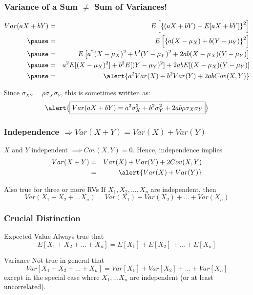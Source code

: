 \documentclass[handout]{beamer}
\begin{document}
\begin{frame}
\frametitle{Variance of a Sum $\neq$ Sum of Variances!}
\footnotesize
\begin{eqnarray*}
	Var(aX + bY) &=& E\left[\left\{\left( aX + bY\right) - E[aX + bY]\right\}^2  \right]\\ \pause
	&=& E\left[  \left\{a (X - \mu_X) + b(Y - \mu_Y)\right\}^2 \right]\\ \pause
	&=& E\left[a^2(X-\mu_X)^2 + b^2(Y-\mu_Y)^2 + 2ab(X-\mu_X)(Y-\mu_Y)  \right]\\ \pause
	&=&a^2E[(X-\mu_X)^2] + b^2 E[(Y-\mu_Y)^2] + 2ab E[(X-\mu_X)(Y-\mu_Y)]\\ \pause
	&=& \alert{a^2 Var(X) + b^2 Var(Y) + 2ab Cov(X,Y)}
\end{eqnarray*}


\vspace{3em}
\normalsize
Since $\sigma_{XY} = \rho\sigma_X \sigma_Y$, this is sometimes written as:
$$\alert{\boxed{Var(aX + bY) = a^2 \sigma_X^2 + b^2 \sigma_Y^2 + 2ab \rho \sigma_X \sigma_Y}}$$
\end{frame}
\begin{frame}
\frametitle{Independence $\Rightarrow Var(X+Y) = Var(X) + Var(Y)$}

$X$ and $Y$ independent $\implies Cov(X,Y)=0$. Hence, independence implies
\begin{eqnarray*}
	Var(X + Y) &=& Var(X) + Var(Y) + 2 Cov(X,Y)\\
			&=& \alert{Var(X) +Var(Y)}
\end{eqnarray*}


\begin{block}{Also true for three or more RVs}
If $X_1, X_2, \hdots, X_n$ are independent, then
	$$Var(X_1 + X_2 + \hdots X_n) = Var(X_1) + Var(X_2) + \hdots + Var(X_n)$$
\end{block}

\end{frame}
\begin{frame}
\frametitle{Crucial Distinction}
\begin{block}{Expected Value}
\alert{Always} true that
	$$E[X_1 + X_2 + \hdots + X_n] = E[X_1] + E[X_2] + \hdots + E[X_n]$$
\end{block}


\begin{block}{Variance}
\alert{Not true in general} that 
	$$Var[X_1 + X_2 + \hdots + X_n] = Var[X_1] + Var[X_2] + \hdots + Var[X_n]$$
except in the special case where $X_1, \hdots X_n$ are independent (or at least uncorrelated).
\end{block}
\end{frame}
\end{document}
